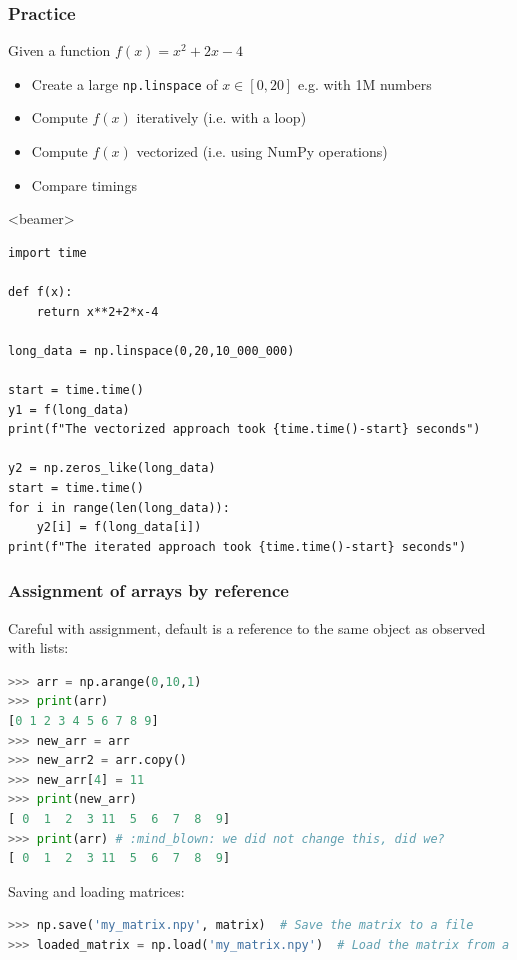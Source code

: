 {\nologo
\begin{frame}[fragile,label=practice_numpy]
  \frametitle{Practice}
  Given a function $\displaystyle  f(x) = x^2+2x-4 $
  \begin{itemize}
   \item Create a large \lstinline|np.linspace| of $x\in[0,20]$ e.g. with 1M numbers
   \item Compute $f(x)$ iteratively (i.e. with a loop)
   \item Compute $f(x)$ vectorized (i.e. using NumPy operations)
   \item Compare timings
  \end{itemize}
   \pause
   \begin{onlyenv}<beamer> 
    \begin{lstlisting}[basicstyle=\tiny\ttfamily]
import time

def f(x):
    return x**2+2*x-4

long_data = np.linspace(0,20,10_000_000)

start = time.time()
y1 = f(long_data)
print(f"The vectorized approach took {time.time()-start} seconds")

y2 = np.zeros_like(long_data)
start = time.time()
for i in range(len(long_data)):
    y2[i] = f(long_data[i])
print(f"The iterated approach took {time.time()-start} seconds")
    \end{lstlisting}
    \end{onlyenv}
 \end{frame}
}

\begin{frame}[fragile]
  \frametitle{Assignment of arrays by reference}
  Careful with assignment, default is a reference to the same object as observed with lists:
  \begin{lstlisting}[language=Python, numbers=none]
>>> arr = np.arange(0,10,1)
>>> print(arr)
[0 1 2 3 4 5 6 7 8 9]
>>> new_arr = arr 
>>> new_arr2 = arr.copy()
>>> new_arr[4] = 11
>>> print(new_arr)
[ 0  1  2  3 11  5  6  7  8  9]
>>> print(arr) # :mind_blown: we did not change this, did we?
[ 0  1  2  3 11  5  6  7  8  9]
  \end{lstlisting}\pause

  Saving and loading matrices:
  \begin{lstlisting}[language=Python, numbers=none]
>>> np.save('my_matrix.npy', matrix)  # Save the matrix to a file
>>> loaded_matrix = np.load('my_matrix.npy')  # Load the matrix from a file
  \end{lstlisting}
\end{frame}

